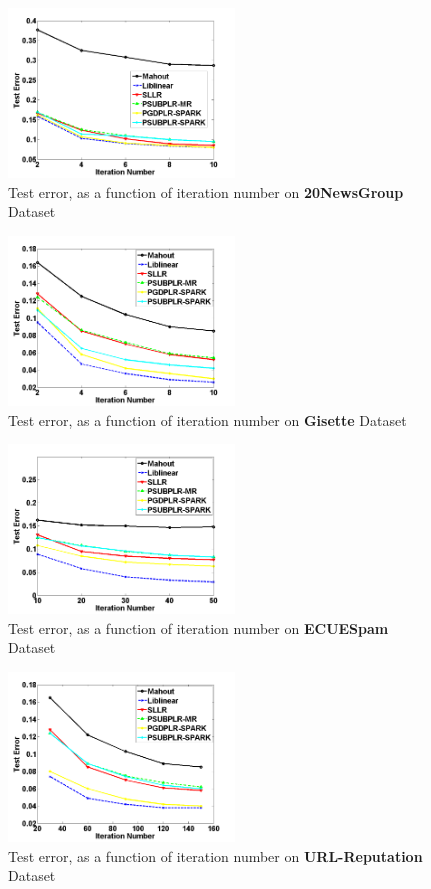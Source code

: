 \documentclass{llncs}
\begin{document}
\begin{figure}[tb] \label{fig:04}
\center \includegraphics[height=4.5cm,width=6cm]{img/20NewsGroup_accuracy_iteration.png}
\caption{Test error, as a function of iteration number on \textbf{20NewsGroup} Dataset}
\end{figure}

\begin{figure}[tb] \label{fig:05}
\center \includegraphics[height=4.5cm,width=6cm]{img/Gisette_accuracy_iteration.png}
\caption{Test error, as a function of iteration number on \textbf{Gisette} Dataset}
\end{figure}

\begin{figure}[tb] \label{fig:06}
\center \includegraphics[height=4.5cm,width=6cm]{img/ECUESpam_accuracy_iteration.png}
\caption{Test error, as a function of iteration number on \textbf{ECUESpam} Dataset}
\end{figure}

\begin{figure}[tb] \label{fig:07}
\center \includegraphics[height=4.5cm,width=6cm]{img/URL-Reputation_accuracy_iteration.png}
\caption{Test error, as a function of iteration number on \textbf{URL-Reputation} Dataset}
\end{figure}
\end{document}
